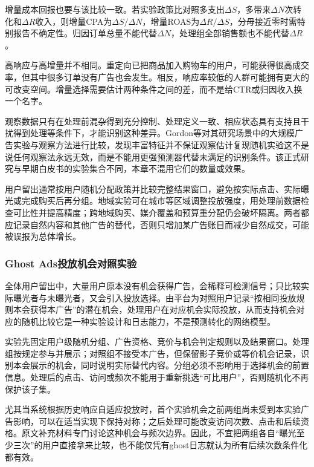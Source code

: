 增量成本回报也要与该比较一致。若实验政策比对照多支出$\Delta S$，多带来$\Delta N$次转化和$\Delta R$收入，则增量CPA为$\Delta S/\Delta N$，增量ROAS为$\Delta R/\Delta S$，分母接近零时需特别报告不确定性。归因订单总量不能代替$\Delta N$，处理组全部销售额也不能代替$\Delta R$。

高响应与高增量并不相同。重定向已把商品加入购物车的用户，可能获得很高成交率，但其中很多订单没有广告也会发生。相反，响应率较低的人群可能拥有更大的可改变空间。增量选择需要估计两种条件之间的差，而不是给CTR或归因收入换一个名字。

观察数据只有在处理前混杂得到充分控制、处理定义一致、相应状态具有支持且干扰得到处理等条件下，才能识别这种差异。Gordon等对其研究场景中的大规模广告实验与观察方法进行比较，发现丰富特征并不保证观察估计复现随机实验这不是说任何观察法永远无效，而是不能用更强预测器代替未满足的识别条件。该正式研究与早期白皮书的实验集合不同，本章不混用它们的数量或效果。

用户留出通常按用户随机分配政策并比较完整结果窗口，避免按实际点击、实际曝光或完成购买后再分组。地域实验可在城市等区域调整投放强度，用处理前数据检查可比性并提高精度；跨地域购买、媒介覆盖和预算重分配仍会破坏隔离。两者都应记录自然内容和其他广告的替代，否则只增加某广告账目而减少自然成交，可能被误报为总体增长。

\subsubsection{Ghost Ads投放机会对照实验}
\label{sec:rs-advertising-ghost}

全体用户留出中，大量用户原本没有机会获得广告，会稀释可检测信号；只比较实际曝光者与未曝光者，又会引入投放选择。由平台为对照用户记录“按相同投放规则本会获得本广告”的潜在机会，处理用户在对应机会实际投放，从而支持机会对应的随机比较它是一种实验设计和日志能力，不是预测转化的网络模型。

实验先固定用户级随机分组、广告资格、竞价与机会判定规则以及结果窗口。处理组按规定参与并展示；对照组不接受本广告，但保留影子竞价或等价机会记录，识别本会展示的机会，同时说明实际替代内容。分组必须不影响用于选择机会的前置信息。处理后的点击、访问或频次不能用于重新挑选“可比用户”，否则随机化不再保护该子集。

尤其当系统根据历史响应自适应投放时，首个实验机会之前两组尚未受到本实验广告影响，可以在适当实现下保持对称；之后处理可能改变访问次数、点击和后续资格。原文补充材料专门讨论这种机会与频次边界。因此，不宜把两组各自“曝光至少三次”的用户直接拿来比较，也不能仅凭有ghost日志就认为所有后续次数条件化都有效。

